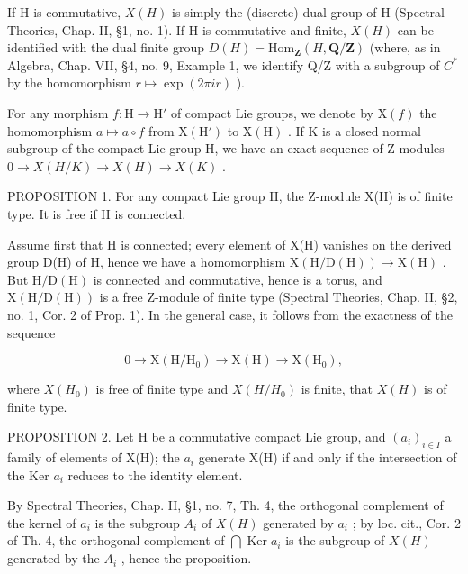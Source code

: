 If H is commutative, \(X(H)\) is simply the (discrete) dual group of H (Spectral Theories, Chap. II, §1, no. 1). If H is commutative and finite, \(X(H)\) can be identified with the dual finite group \(D(H) = \text{Hom}_{\mathbf{Z}}(H, \mathbf{Q}/\mathbf{Z})\) (where, as in Algebra, Chap. VII, §4, no. 9, Example 1, we identify Q/Z with a subgroup of \(C^{*}\) by the homomorphism \(r \mapsto \exp(2\pi ir)\) ).

For any morphism \(f: \mathrm{H} \to \mathrm{H}'\) of compact Lie groups, we denote by \(\mathrm{X}(f)\) the homomorphism \(a \mapsto a \circ f\) from \(\mathrm{X}(\mathrm{H}')\) to \(\mathrm{X}(\mathrm{H})\) . If \(\mathrm{K}\) is a closed normal subgroup of the compact Lie group H, we have an exact sequence of Z-modules \(0 \rightarrow X(H/K) \rightarrow X(H) \rightarrow X(K)\) .

PROPOSITION 1. For any compact Lie group H, the Z-module X(H) is of finite type. It is free if H is connected.

Assume first that H is connected; every element of X(H) vanishes on the derived group D(H) of H, hence we have a homomorphism \(\mathrm{X}(\mathrm{H}/\mathrm{D}(\mathrm{H}))\to\mathrm{X}(\mathrm{H})\) . But \(\mathrm{H}/\mathrm{D}(\mathrm{H})\) is connected and commutative, hence is a torus, and \(\mathrm{X}(\mathrm{H}/\mathrm{D}(\mathrm{H}))\) is a free Z-module of finite type (Spectral Theories, Chap. II, §2, no. 1, Cor. 2 of Prop. 1). In the general case, it follows from the exactness of the sequence

\[
0 \to \mathrm{X} (\mathrm{H} / \mathrm{H} _ {0}) \to \mathrm{X} (\mathrm{H}) \to \mathrm{X} (\mathrm{H} _ {0}),
\]

where \(X(H_{0})\) is free of finite type and \(X(H/H_{0})\) is finite, that \(X(H)\) is of finite type.

PROPOSITION 2. Let H be a commutative compact Lie group, and \((a_{i})_{i\in I}\) a family of elements of X(H); the \(a_{i}\) generate X(H) if and only if the intersection of the Ker \(a_{i}\) reduces to the identity element.

By Spectral Theories, Chap. II, §1, no. 7, Th. 4, the orthogonal complement of the kernel of \(a_i\) is the subgroup \(A_i\) of \(X(H)\) generated by \(a_i\) ; by loc. cit., Cor. 2 of Th. 4, the orthogonal complement of \(\bigcap \operatorname{Ker} a_i\) is the subgroup of \(X(H)\) generated by the \(A_i\) , hence the proposition.

